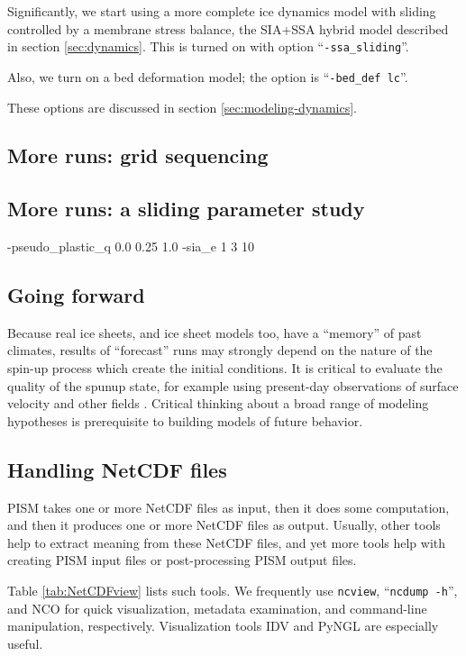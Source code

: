 Significantly, we start using a more complete ice dynamics model with sliding controlled by a membrane stress balance, the SIA+SSA hybrid model described in section \ref{sec:dynamics}.  This is turned on with option ``\texttt{-ssa_sliding}''.

Also, we turn on a bed deformation model; the option is ``\texttt{-bed_def lc}''.  

These options are discussed in section \ref{sec:modeling-dynamics}.



\subsection{More runs: grid sequencing}  \label{subsect:gridseq}  

\subsection{More runs: a sliding parameter study}  \label{subsect:paramstudy}

-pseudo_plastic_q   0.0 0.25 1.0
-sia_e   1 3 10

\subsection{Going forward}  \label{subsect:forecastcaution}  Because real ice sheets, and ice sheet models too, have a ``memory'' of past climates, results of ``forecast'' runs may strongly depend on the nature of the spin-up process which create the initial conditions.  It is critical to evaluate the quality of the spunup state, for example using present-day observations of surface velocity and other fields \cite{AschwandenAdalgeirsdottirKhroulev}.  Critical thinking about a broad range of modeling hypotheses is prerequisite to building models of future behavior.


\subsection{Handling NetCDF files}\label{subsect:nctoolsintro}  PISM takes one or more NetCDF files as input, then it does some computation, and then it produces one or more NetCDF files as output.  Usually, other tools help to extract meaning from these NetCDF files, and yet more tools help with creating PISM input files or post-processing PISM output files.

Table \ref{tab:NetCDFview} lists such tools.  We frequently use \texttt{ncview}, ``\texttt{ncdump -h}'', and NCO for quick visualization, metadata examination, and command-line manipulation, respectively.  Visualization tools IDV and PyNGL are especially useful.  

